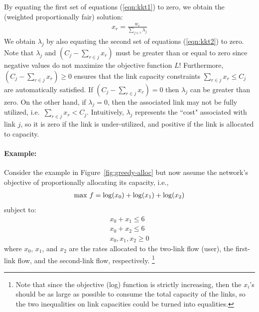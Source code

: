 \documentclass{article}
\def\lg{{\rm log}}
\begin{document}
By equating the first set of equations (\ref{eqn:kkt1}) to zero, we obtain the (weighted proportionally fair) solution:
\begin{eqnarray}
x_r = \frac{w_r}{\sum_{j \in r} \lambda_j} 
\label{eqn:opt-x}
\end{eqnarray}
We obtain $\lambda_j$ by also equating the second set of equations (\ref{eqn:kkt2}) to zero. 
Note that $\lambda_j$ and $(C_j - \sum_{r \in j} x_r)$ must be greater than or equal to zero since negative values do not maximize the objective function $L$!  Furthermore, 
$(C_j - \sum_{r \in j} x_r) \geq 0$ ensures that the link capacity constraints $\sum_{r \in j} x_r \leq C_j$ are automatically satisfied. 
If $(C_j - \sum_{r \in j} x_r) = 0$ then $\lambda_j$ can be greater than zero. On the other hand,
if  $\lambda_j = 0$, then the associated link may not be fully utilized, i.e.\ $\sum_{r \in j} x_r < C_j$. 
Intuitively, $\lambda_j$ represents the ``cost" associated with link $j$, so it is zero if the link is under-utilized,
and positive if the link is allocated to capacity.

\paragraph{Example:}
Consider the example in Figure~\ref{fig:greedy-alloc} but now assume the network's objective of proportionally allocating its capacity, i.e., 
\begin{eqnarray*}
{\rm max}\  f = \lg(x_0) + \lg(x_1) + \lg(x_2) 
\end{eqnarray*}
subject to:
\begin{eqnarray*}
x_0 + x_1 \leq 6 \\
x_0 + x_2 \leq 6 \\
x_0, x_1, x_2 \geq 0
\end{eqnarray*}
where $x_0$, $x_1$, and $x_2$ are the rates allocated to the two-link flow (user), the first-link flow, and the second-link flow, respectively. \footnote{Note that since the objective (log) function is strictly increasing, then the $x_i$'s should be as large as possible to consume the total capacity of the links, so the two inequalities on link capacities could be turned into equalities. }
\end{document}
